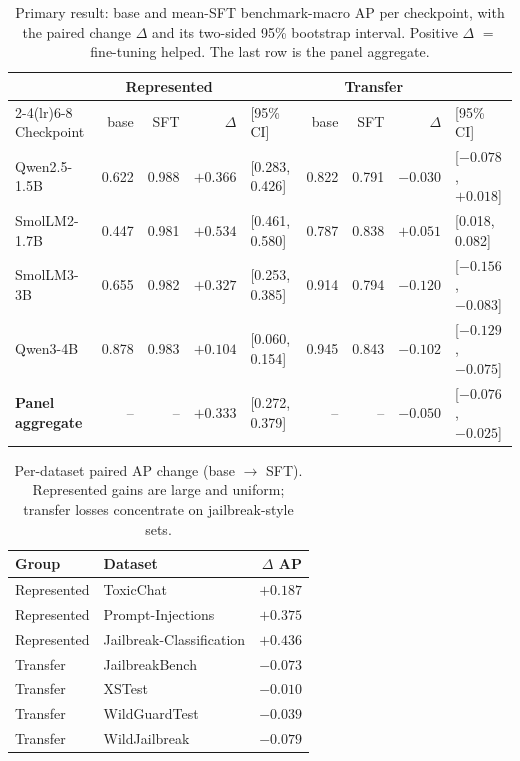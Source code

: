 \documentclass[11pt]{article}
\begin{document}
\begin{table}[t]
\centering\small
\caption{Primary result: base and mean-SFT benchmark-macro AP per checkpoint, with the paired
change $\Delta$ and its two-sided 95\% bootstrap interval. Positive $\Delta$ $=$ fine-tuning
helped. The last row is the panel aggregate.}
\label{tab:primary}
\setlength{\tabcolsep}{4pt}
\begin{tabular}{l rr r@{\ }l rr r@{\ }l}
\toprule
& \multicolumn{3}{c}{Represented} && \multicolumn{3}{c}{Transfer} &\\
\cmidrule(lr){2-4}\cmidrule(lr){6-8}
Checkpoint & base & SFT & $\Delta$ & [95\% CI] & base & SFT & $\Delta$ & [95\% CI]\\
\midrule
Qwen2.5-1.5B & 0.622 & 0.988 & $+0.366$ & [0.283, 0.426] & 0.822 & 0.791 & $-0.030$ & [$-0.078$, $+0.018$]\\
SmolLM2-1.7B & 0.447 & 0.981 & $+0.534$ & [0.461, 0.580] & 0.787 & 0.838 & $+0.051$ & [0.018, 0.082]\\
SmolLM3-3B  & 0.655 & 0.982 & $+0.327$ & [0.253, 0.385] & 0.914 & 0.794 & $-0.120$ & [$-0.156$, $-0.083$]\\
Qwen3-4B   & 0.878 & 0.983 & $+0.104$ & [0.060, 0.154] & 0.945 & 0.843 & $-0.102$ & [$-0.129$, $-0.075$]\\
\midrule
\textbf{Panel aggregate} & -- & -- & $+0.333$ & [0.272, 0.379] & -- & -- & $-0.050$ & [$-0.076$, $-0.025$]\\
\bottomrule
\end{tabular}
\end{table}

\begin{table}[t]
\centering\small
\caption{Per-dataset paired AP change (base $\to$ SFT). Represented gains are large and
uniform; transfer losses concentrate on jailbreak-style sets.}
\label{tab:perbench}
\begin{tabular}{llr}
\toprule
Group & Dataset & $\Delta$ AP \\
\midrule
Represented & ToxicChat & $+0.187$ \\
Represented & Prompt-Injections & $+0.375$ \\
Represented & Jailbreak-Classification & $+0.436$ \\
\midrule
Transfer & JailbreakBench & $-0.073$ \\
Transfer & XSTest & $-0.010$ \\
Transfer & WildGuardTest & $-0.039$ \\
Transfer & WildJailbreak & $-0.079$ \\
\bottomrule
\end{tabular}
\end{table}
\end{document}

